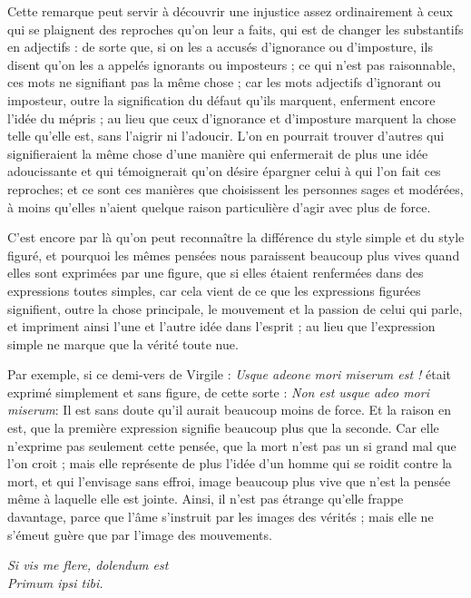 Cette remarque peut servir à découvrir une injustice assez ordinairement à ceux qui se plaignent des reproches qu'on leur a faits, qui est de changer les substantifs en adjectifs : de sorte que, si on les a accusés d'ignorance ou d'imposture, ils disent qu'on les a appelés ignorants ou imposteurs ; ce qui n'est pas raisonnable, ces mots ne signifiant pas la même chose ; car les mots adjectifs d'ignorant ou imposteur, outre la signification du défaut qu'ils marquent, enferment encore l'idée du mépris ; au lieu que ceux d'ignorance et d'imposture marquent la chose telle qu'elle est, sans l'aigrir ni l'adoucir. L'on en pourrait trouver d'autres qui signifieraient la même chose d'une manière qui enfermerait de plus une idée adoucissante et qui témoignerait qu'on désire épargner celui à qui l'on fait ces reproches; et ce sont ces manières que choisissent les personnes sages et modérées, à moins qu'elles n'aient quelque raison particulière d'agir avec plus de force.

C'est encore par là qu'on peut reconnaître la différence du style simple et du style figuré, et pourquoi les mêmes pensées nous paraissent beaucoup plus vives quand elles sont exprimées par une figure, que si elles étaient renfermées dans des expressions toutes simples, car cela vient de ce que les expressions figurées signifient, outre la chose principale, le mouvement et la passion de celui qui parle, et impriment ainsi l'une et l'autre idée dans l'esprit ; au lieu que l'expression simple ne marque que la vérité toute nue.

Par exemple, si ce demi-vers de Virgile : \emph{Usque adeone mori miserum est !} était exprimé simplement et sans figure, de cette sorte : \emph{Non est usque adeo mori miserum}: Il est sans doute qu'il aurait beaucoup moins de force. Et la raison en est, que la première expression signifie beaucoup plus que la seconde. Car elle n'exprime pas seulement cette pensée, que la mort n'est pas un si grand mal que l'on croit ; mais elle représente de plus l'idée d'un homme qui se roidit contre la mort, et qui l'envisage sans effroi, image beaucoup plus vive que n'est la pensée même à laquelle elle est jointe. Ainsi, il n'est pas étrange qu'elle frappe davantage, parce que l'âme s'instruit par les images des vérités ; mais elle ne s'émeut guère que par l'image des mouvements.

\begin{center}\emph{Si vis me flere, dolendum est \\Primum ipsi tibi.}\end{center}

